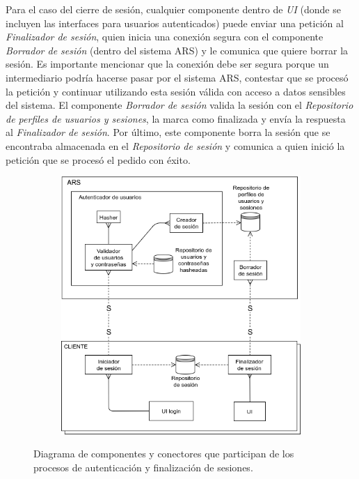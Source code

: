 \par Para el caso del cierre de sesión, cualquier componente dentro de \textit{UI} (donde se incluyen las interfaces para usuarios autenticados) puede enviar una petición al \textit{Finalizador de sesión}, quien inicia una conexión segura con el componente \textit{Borrador de sesión} (dentro del sistema ARS) y le comunica que quiere borrar la sesión. Es importante mencionar que la conexión debe ser segura porque un intermediario podría hacerse pasar por el sistema ARS, contestar que se procesó la petición y continuar utilizando esta sesión válida con acceso a datos sensibles del sistema. El componente \textit{Borrador de sesión} valida la sesión con el \textit{Repositorio de perfiles de usuarios y sesiones}, la marca como finalizada y envía la respuesta al \textit{Finalizador de sesión}. Por último, este componente borra la sesión que se encontraba almacenada en el \textit{Repositorio de sesión} y comunica a quien inició la petición que se procesó el pedido con éxito.

\begin{figure}[H]
  \begin{subfigure}{\textwidth}
    \includegraphics[width=\textwidth]{imagenes/diagramas/loginYLogout.png}
  \end{subfigure}
  \caption{Diagrama de componentes y conectores que participan de los procesos de autenticación y finalización de sesiones.}
  \label{fig:dia_cyc_autenticacion}
\end{figure}



\newpage